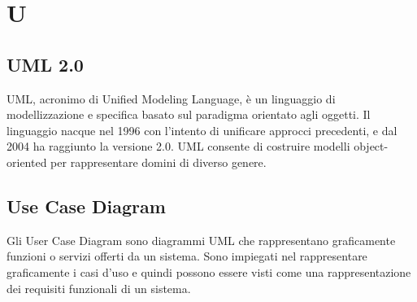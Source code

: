 \section{U}

    \subsection*{UML 2.0}

        UML, acronimo di Unified Modeling Language, è un linguaggio di modellizzazione e specifica basato sul paradigma
        orientato agli oggetti. Il linguaggio nacque nel 1996 con l'intento di unificare approcci precedenti, e dal 2004
        ha raggiunto la versione 2.0. UML consente di costruire modelli object-oriented per rappresentare domini di
        diverso genere.

    \subsection*{Use Case Diagram}

        Gli User Case Diagram sono diagrammi UML che rappresentano graficamente funzioni o servizi offerti da un sistema.
        Sono impiegati nel rappresentare graficamente i casi d'uso e quindi possono essere visti come una rappresentazione
        dei requisiti funzionali di un sistema.